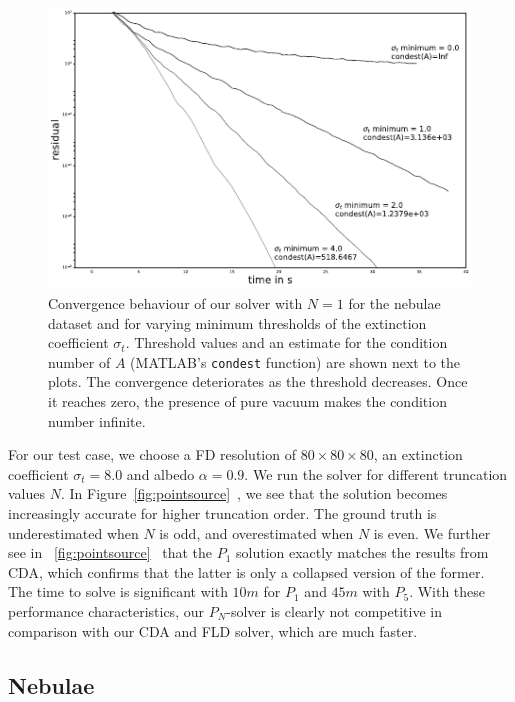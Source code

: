 \documentclass{egpubl}
\newcommand{\icaption}[1]{\caption{#1}}
\newcommand{\nocontentsline}[3]{}
\newcommand{\tocless}[2]{\bgroup\let\addcontentsline=\nocontentsline#1{#2}\egroup}
\begin{document}
\begin{figure}[!t]
\centering
\includegraphics[width=0.7\columnwidth]{fig_nebulae_p1_convergence_small.pdf}
\icaption{Convergence behaviour of our solver with $N=1$ for the nebulae dataset and for varying minimum thresholds of the extinction coefficient $\sigma_t$. Threshold values and an estimate for the condition number of $A$ (MATLAB's \texttt{condest} function) are shown next to the plots. The convergence deteriorates as the threshold decreases. Once it reaches zero, the presence of pure vacuum makes the condition number infinite. \vspace{-0.2in}}
\label{fig:results_convergence}
\end{figure}

For our test case, we choose a FD resolution of $80\times80\times80$, an extinction coefficient $\sigma_t=8.0$ and albedo $\alpha=0.9$. We run the solver for different truncation values $N$. In Figure~\ref{fig:pointsource}~, we see that the solution becomes increasingly accurate for higher truncation order. The ground truth is underestimated when $N$ is odd, and overestimated when $N$ is even. We further see in ~\ref{fig:pointsource}~ that the $P_1$ solution exactly matches the results from CDA, which confirms that the latter is only a collapsed version of the former. The time to solve is significant with $10m$ for $P_1$ and $45m$ with $P_5$. With these performance characteristics, our $P_N$-solver is clearly not competitive in comparison with our CDA and FLD solver, which are much faster.

\tocless\subsection{Nebulae}
\end{document}
